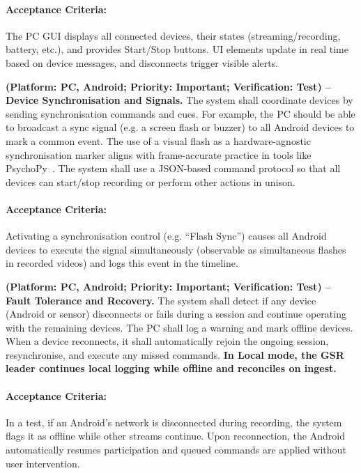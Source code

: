 \documentclass{report}
\begin{document}
\begin{description}[leftmargin=0cm]
        \paragraph{Acceptance Criteria:} The PC GUI displays all connected devices, their states (streaming/recording, battery, etc.), and provides Start/Stop buttons. UI elements update in real time based on device messages, and disconnects trigger visible alerts.

        \item \textbf{(Platform: PC, Android; Priority: Important; Verification: Test) – Device Synchronisation and Signals.} The system shall coordinate devices by sending synchronisation commands and cues. For example, the PC should be able to broadcast a sync signal (e.g. a screen flash or buzzer) to all Android devices to mark a common event. The use of a visual flash as a hardware-agnostic synchronisation marker aligns with frame-accurate practice in tools like PsychoPy~\cite{peirce2019psychopy}. The system shall use a JSON-based command protocol so that all devices can start/stop recording or perform other actions in unison.
        \paragraph{Acceptance Criteria:} Activating a synchronisation control (e.g. “Flash Sync”) causes all Android devices to execute the signal simultaneously (observable as simultaneous flashes in recorded videos) and logs this event in the timeline.

        \item \textbf{(Platform: PC, Android; Priority: Important; Verification: Test) – Fault Tolerance and Recovery.} The system shall detect if any device (Android or sensor) disconnects or fails during a session and continue operating with the remaining devices. The PC shall log a warning and mark offline devices. When a device reconnects, it shall automatically rejoin the ongoing session, resynchronise, and execute any missed commands. \textbf{In Local mode, the GSR leader continues local logging while offline and reconciles on ingest.}
        \paragraph{Acceptance Criteria:} In a test, if an Android’s network is disconnected during recording, the system flags it as offline while other streams continue. Upon reconnection, the Android automatically resumes participation and queued commands are applied without user intervention.


\end{description}
\end{document}
